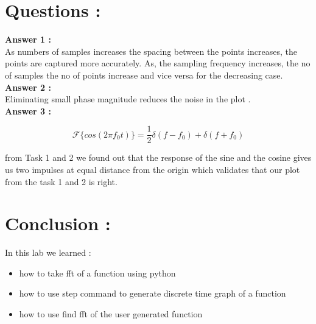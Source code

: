 \documentclass{article}
\begin{document}
\section{Questions :}
\textbf{Answer 1 :}
\\As numbers of samples increases the spacing between the points increases, the points are captured more accurately. As, the sampling frequency increases, the no of samples the no of points increase and vice versa for the decreasing case.
\\ \textbf{Answer 2 :}
\\ Eliminating small phase magnitude reduces the noise in the plot .
\\ \textbf{Answer 3 :}
\\ \begin{large}

$$ \mathcal{F}\{cos(2\pi f_0 t) \} = \frac{1}{2} \delta(f - f_0) + \delta(f + f_0) $$



\end{large}

from Task 1 and 2 we found out that the response of the sine and the cosine gives us two impulses at equal distance from the origin which validates that our plot from the task 1 and 2 is right.

\section{Conclusion :}
In this lab we learned :
\begin{itemize}
\item how to take fft of a function using python
\item how to use step command to generate discrete time graph of a function
\item how to use find fft of the user generated function
\end{itemize}
\end{document}

